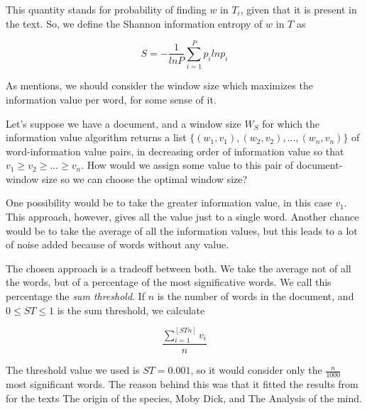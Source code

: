 \documentclass{pnastwo}
\begin{document}
\begin{article}
This quantity stands for probability of finding $w$ in $T_i$, given that it is present in the text. So, 
we define the Shannon information entropy of $w$ in $T$ as

\begin{equation}
  S = -\frac{1}{ln P}\sum_{i=1}^{P}p_i ln p_i
\end{equation}




As \cite{DARWIN} mentions, we should consider the window size which maximizes the information value per word, for some sense of it.

Let's suppose we have a document, and a window size $W_S$ for which the information value algorithm returns a list $\{(w_1, v_1), (w_2, v_2), \dots ,(w_n, v_n) \}$ of word-information value pairs, in decreasing order of information value so that $v_1 \geq v_2 \geq \dots \geq v_n$. How would we assign some value to this pair of document-window size so we can choose the optimal window size?

One possibility would be to take the greater information value, in this case $v_1$. This approach, however, gives all the value just to a single word. Another chance would be to take the average of all the information values, but this leads to a lot of noise added because of words without any value.


The chosen approach is a tradeoff between both. We take the average not of all the words, but of a percentage of the most significative words. We call this percentage the \emph{sum threshold}. If $n$ is the number of words in the document, and $0 \leq ST \leq 1$ is the sum threshold, we calculate

\begin{equation}
  \frac{\sum_{i=1}^{[ST n]}v_i}{n} 
\end{equation}


The threshold value we used is $ST=0.001$, so it would consider only the $\frac{n}{1000}$ most significant words. The reason behind this was that it fitted the results from \cite{DARWIN} for the texts The origin of the species, Moby Dick, and  The Analysis of the mind.



\end{article}
\end{document}
